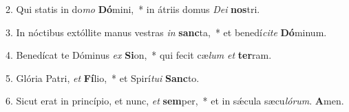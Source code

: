 2. Qui statis in do\textit{mo} \textbf{Dó}mini,~*  in átriis domus \textit{De}\textit{i} \textbf{nos}tri.\

3. In nóctibus extóllite manus vestras \textit{in} \textbf{sanc}ta,~*  et benedí\textit{ci}\textit{te} \textbf{Dó}minum.\

4. Benedícat te Dóminus \textit{ex} \textbf{Si}on,~*  qui fecit cæ\textit{lum} \textit{et} \textbf{ter}ram.\

5. Glória Patri, \textit{et} \textbf{Fí}lio,~*  et Spirí\textit{tu}\textit{i} \textbf{Sanc}to.\

6. Sicut erat in princípio, et nunc, \textit{et} \textbf{sem}per,~*  et in sǽcula sæcu\textit{ló}\textit{rum}. \textbf{A}men.\

